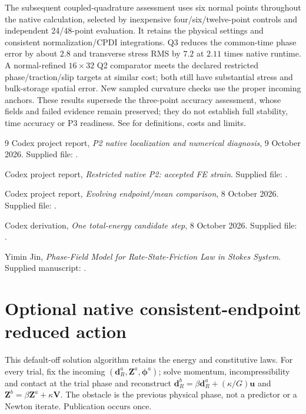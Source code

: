 \documentclass[11pt,a4paper]{article}
\newcommand{\vect}[1]{\boldsymbol{#1}}
\begin{document}
The subsequent coupled-quadrature assessment uses six normal points throughout
the native calculation, selected by inexpensive four/six/twelve-point controls
and independent 24/48-point evaluation. It retains the physical settings and
consistent normalization/CPDI integrations. Q3 reduces the common-time phase
error by about $2.8$ and transverse stress RMS by $7.2$ at $2.11$ times native
runtime. A normal-refined $16\times32$ Q2 comparator meets the declared restricted
phase/traction/slip targets at similar cost; both still have substantial stress
and bulk-storage spatial error. New sampled curvature checks use the proper
incoming anchors. These results supersede the three-point accuracy assessment,
whose fields and failed evidence remain preserved; they do not establish full
stability, time accuracy or P3 readiness. See
 for definitions, costs and limits.

\clearpage
\begin{thebibliography}{9}
\small
{}
Codex project report, \emph{P2 native localization and numerical diagnosis},
9 October 2026. Supplied file: .

Codex project report, \emph{Restricted native P2: accepted FE strain}.
Supplied file: .

Codex project report, \emph{Evolving endpoint/mean comparison},
8 October 2026. Supplied file: .

Codex derivation, \emph{One total-energy candidate step},
8 October 2026. Supplied file: .

Yimin Jin, \emph{Phase-Field Model for Rate-State-Friction Law in Stokes System}.
Supplied manuscript: .
\end{thebibliography}

\section{Optional native consistent-endpoint reduced action}
This default-off solution algorithm retains the energy and constitutive laws.
For every trial, fix the incoming $(\bm d_R^a,\vect Z^a,\vect\phi^a)$;
solve momentum, incompressibility and contact at the trial phase and reconstruct
$\bm d_R^b=\beta\bm d_R^a+(\kappa/G)\bm u$ and
$\vect Z^b=\beta\vect Z^a+\kappa\vect V$. The obstacle is the previous physical
phase, not a predictor or a Newton iterate. Publication occurs once.
\end{document}

